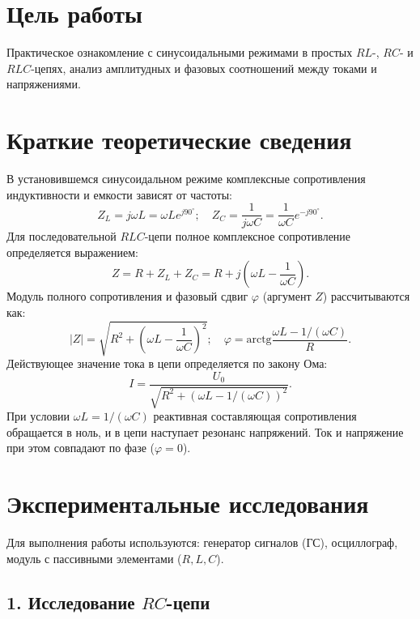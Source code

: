\section*{Цель работы}
Практическое ознакомление с синусоидальными режимами в простых $RL$-, $RC$- и $RLC$-цепях, анализ амплитудных и фазовых соотношений между токами и напряжениями.

\section*{Краткие теоретические сведения}
В установившемся синусоидальном режиме комплексные сопротивления индуктивности и емкости зависят от частоты:
\begin{equation*}
    Z_L = j\omega L = \omega L e^{j90^\circ}; \quad Z_C = \frac{1}{j\omega C} = \frac{1}{\omega C} e^{-j90^\circ}.
\end{equation*}
Для последовательной $RLC$-цепи полное комплексное сопротивление определяется выражением:
\begin{equation*}
    Z = R + Z_L + Z_C = R + j\left( \omega L - \frac{1}{\omega C} \right).
\end{equation*}
Модуль полного сопротивления и фазовый сдвиг $\varphi$ (аргумент $Z$) рассчитываются как:
\begin{equation*}
    |Z| = \sqrt{R^2 + \left( \omega L - \frac{1}{\omega C} \right)^2}; \quad \varphi = \text{arctg} \frac{\omega L - 1/(\omega C)}{R}.
\end{equation*}
Действующее значение тока в цепи определяется по закону Ома:
\begin{equation*}
    I = \frac{U_0}{\sqrt{R^2 + \left( \omega L - 1/(\omega C) \right)^2}}.
\end{equation*}
При условии $\omega L = 1/(\omega C)$ реактивная составляющая сопротивления обращается в ноль, и в цепи наступает резонанс напряжений. Ток и напряжение при этом совпадают по фазе ($\varphi = 0$).

\section*{Экспериментальные исследования}

Для выполнения работы используются: генератор сигналов (ГС), осциллограф, модуль с пассивными элементами ($R, L, C$).

\subsection*{1. Исследование $RC$-цепи}

